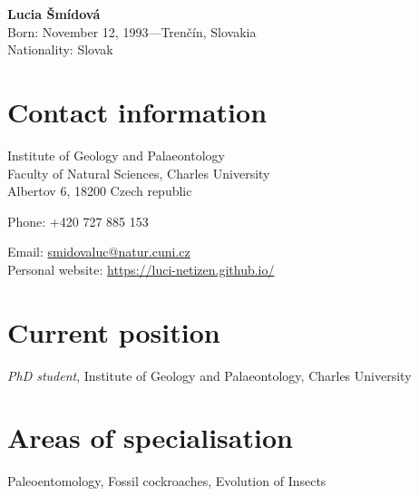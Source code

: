 \documentclass[11pt]{article} %
\begin{document}

{\LARGE\bfseries Lucia Šmídová} \\ %

Born: November 12, 1993---Trenčín, Slovakia\\ %
Nationality: Slovak%

\begin{multicols}{2}
	\section*{Contact information}
	Institute of Geology and Palaeontology\\ %
	Faculty of Natural Sciences, Charles University\\ Albertov 6, 18200 Czech republic
	\medskip %
	




Phone: +420 727 885 153\ %


Email: \href{mailto:smidovaluc@natur.cuni.cz}{smidovaluc@natur.cuni.cz}\\ %
Personal website: \href{https://luci-netizen.github.io/personal_website/index.html}{https://luci-netizen.github.io/}\\ %

\vspace{0.03\textheight} %




\section*{Current position}

\emph{PhD student}, Institute of Geology and Palaeontology, Charles University %


\section*{Areas of specialisation}

Paleoentomology, Fossil cockroaches, Evolution of Insects %

\end{multicols}
\end{document}
